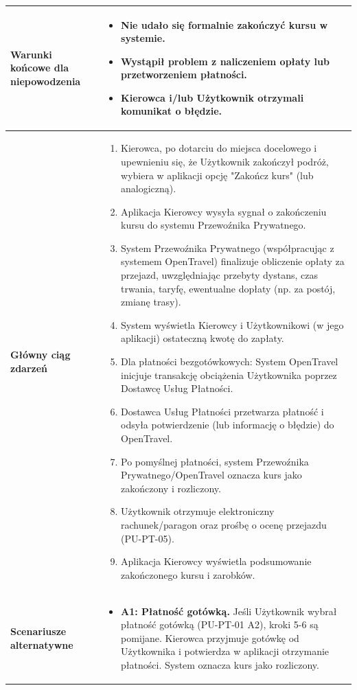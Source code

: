 \documentclass[a4paper,12pt]{article}
\begin{document}
\begin{longtable}{|p{\pierwszakolumnaszerokoscPUTPTZakonczenie}|p{\drugakolumnaszerokoscPUTPTZakonczenie}|}
    \hline
    \textbf{Warunki końcowe dla niepowodzenia} &
        \begin{itemize} \itemsep0pt \parskip0pt \parsep0pt
            \item Nie udało się formalnie zakończyć kursu w systemie.
            \item Wystąpił problem z naliczeniem opłaty lub przetworzeniem płatności.
            \item Kierowca i/lub Użytkownik otrzymali komunikat o błędzie.
        \end{itemize} \\
    \hline
    \textbf{Główny ciąg zdarzeń} &
        \begin{enumerate} \itemsep0pt \parskip0pt \parsep0pt
            \item Kierowca, po dotarciu do miejsca docelowego i upewnieniu się, że Użytkownik zakończył podróż, wybiera w aplikacji opcję "Zakończ kurs" (lub analogiczną).
            \item Aplikacja Kierowcy wysyła sygnał o zakończeniu kursu do systemu Przewoźnika Prywatnego.
            \item System Przewoźnika Prywatnego (współpracując z systemem OpenTravel) finalizuje obliczenie opłaty za przejazd, uwzględniając przebyty dystans, czas trwania, taryfę, ewentualne dopłaty (np. za postój, zmianę trasy).
            \item System wyświetla Kierowcy i Użytkownikowi (w jego aplikacji) ostateczną kwotę do zapłaty.
            \item Dla płatności bezgotówkowych: System OpenTravel inicjuje transakcję obciążenia Użytkownika poprzez Dostawcę Usług Płatności.
            \item Dostawca Usług Płatności przetwarza płatność i odsyła potwierdzenie (lub informację o błędzie) do OpenTravel.
            \item Po pomyślnej płatności, system Przewoźnika Prywatnego/OpenTravel oznacza kurs jako zakończony i rozliczony.
            \item Użytkownik otrzymuje elektroniczny rachunek/paragon oraz prośbę o ocenę przejazdu (PU-PT-05).
            \item Aplikacja Kierowcy wyświetla podsumowanie zakończonego kursu i zarobków.
        \end{enumerate} \\
    \hline
    \textbf{Scenariusze alternatywne} &
        \begin{itemize} \itemsep0pt \parskip0pt \parsep0pt
            \item \textbf{A1: Płatność gotówką.} Jeśli Użytkownik wybrał płatność gotówką (PU-PT-01 A2), kroki 5-6 są pomijane. Kierowca przyjmuje gotówkę od Użytkownika i potwierdza w aplikacji otrzymanie płatności. System oznacza kurs jako rozliczony.

\end{itemize}
\end{longtable}
\end{document}
